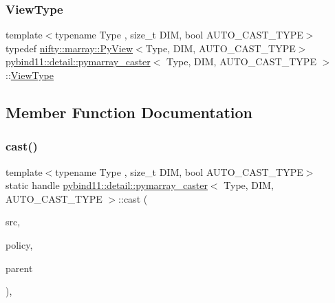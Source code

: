 \mbox{\label{structpybind11_1_1detail_1_1pymarray__caster_a0593b33c0ed08f1b25b34dbc3da1b01c}} 
\subsubsection{\texorpdfstring{View\+Type}{ViewType}}
{\footnotesize\ttfamily template$<$typename Type , size\+\_\+t D\+IM, bool A\+U\+T\+O\+\_\+\+C\+A\+S\+T\+\_\+\+T\+Y\+PE$>$ \\
typedef \hyperlink{classnifty_1_1marray_1_1PyView}{nifty\+::marray\+::\+Py\+View}$<$Type, D\+IM, A\+U\+T\+O\+\_\+\+C\+A\+S\+T\+\_\+\+T\+Y\+PE$>$ \hyperlink{structpybind11_1_1detail_1_1pymarray__caster}{pybind11\+::detail\+::pymarray\+\_\+caster}$<$ Type, D\+IM, A\+U\+T\+O\+\_\+\+C\+A\+S\+T\+\_\+\+T\+Y\+PE $>$\+::\hyperlink{structpybind11_1_1detail_1_1pymarray__caster_a0593b33c0ed08f1b25b34dbc3da1b01c}{View\+Type}}



\subsection{Member Function Documentation}
\mbox{\label{structpybind11_1_1detail_1_1pymarray__caster_ac614bd95690d2ab5f17c3b2603485404}} 
\subsubsection{\texorpdfstring{cast()}{cast()}}
{\footnotesize\ttfamily template$<$typename Type , size\+\_\+t D\+IM, bool A\+U\+T\+O\+\_\+\+C\+A\+S\+T\+\_\+\+T\+Y\+PE$>$ \\
static handle \hyperlink{structpybind11_1_1detail_1_1pymarray__caster}{pybind11\+::detail\+::pymarray\+\_\+caster}$<$ Type, D\+IM, A\+U\+T\+O\+\_\+\+C\+A\+S\+T\+\_\+\+T\+Y\+PE $>$\+::cast (\begin{DoxyParamCaption}\item[{\hyperlink{structpybind11_1_1detail_1_1pymarray__caster_a0593b33c0ed08f1b25b34dbc3da1b01c}{View\+Type}}]{src,  }\item[{return\+\_\+value\+\_\+policy}]{policy,  }\item[{handle}]{parent }\end{DoxyParamCaption})\hspace{0.3cm}{\ttfamily [inline]}, {\ttfamily [static]}}

